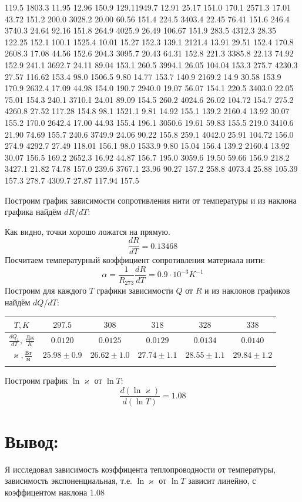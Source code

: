 \documentclass[a4paper,12pt]{article}
\begin{document}
119.5 1803.3 11.95 12.96 150.9
129.11949.7 12.91 25.17 151.0
170.1 2571.3 17.01 43.72 151.2
200.0 3028.2 20.00 60.56 151.4
224.5 3403.4 22.45 76.41 151.6
246.4 3740.3 24.64 92.16 151.8
264.9 4025.9 26.49 106.67 151.9
283.5 4312.3 28.35 122.25 152.1
100.1 1525.4 10.01 15.27 152.3
139.1 2121.4 13.91 29.51 152.4
170.8 2608.3 17.08 44.56 152.6
204.3 3095.7 20.43 64.31 152.8
221.3 3385.8 22.13 74.92 152.9
241.1 3692.7 24.11 89.04 153.1
260.5 3994.1 26.05 104.04 153.3
275.7 4230.3 27.57 116.62 153.4
98.0 1506.5 9.80 14.77 153.7
140.9 2169.2 14.9 30.58 153.9
170.9 2632.4 17.09 44.98 154.0
190.7 2940.0 19.07 56.07 154.1
220.5 3403.0 22.05 75.01 154.3
240.1 3710.1 24.01 89.09 154.5
260.2 4024.6 26.02 104.72 154.7
275.2 4260.8 27.52 117.28 154.8
98.1 1521.1 9.81 14.92 155.1
139.2 2160.4 13.92 30.07 155.2
170.0 2642.4 17.00 44.93 155.4
196.1 3050.6 19.61 59.83 155.5
219.0 3410.6 21.90 74.69 155.7
240.6 3749.9 24.06 90.22 155.8
259.1 4042.0 25.91 104.72 156.0
274.9 4292.7 27.49 118.01 156.1
98.0 1533.9 9.80 15.04 156.4
139.2 2160.4 13.92 30.07 156.5
169.2 2652.3 16.92 44.87 156.7
195.0 3059.6 19.50 59.66 156.9
218.2 3427.1 21.82 74.78 157.0
239.6 3767.1 23.96 90.27 157.2
258.8 4073.4 25.88 105.39 157.3
278.7 4309.7 27.87 117.94 157.5

Построим график зависимости сопротивления нити от температуры и из наклона графика найдём $dR/dT$:

Как видно, точки хорошо ложатся на прямую.
\[
  \frac{dR}{dT} = 0.13468
\]
Посчитаем температурный коэффициент сопротивления материала нити:
\[
  \alpha = \frac{1}{R_{273}} \frac{dR}{dT} = 0.9 \cdot 10^{-3} K^{-1}
\]
Построим для каждого $T$ графики зависимости $Q$ от $R$ и из наклонов графиков найдём $dQ/dT$:

\begin{tabular}{|c|c|c|c|c|c|}
  \hline
  $T, K$                                  & $297.5$         & $308$           & $318$           & $328$           & $338$           \\\hline
  $\frac{dQ_1}{dT},\ \frac{\text{Дж}}{K}$ & $0.0120$        & $0.0125$        & $0.0129$        & $0.0134$        & $0.0140$        \\\hline
  $\varkappa, \frac{\text{Вт}}{\text{м}}$ & $25.98 \pm 0.9$ & $26.62 \pm 1.0$ & $27.74 \pm 1.1$ & $28.55 \pm 1.1$ & $29.84 \pm 1.2$ \\\hline
  \\
\end{tabular}
Построим график $\ln\varkappa$ от $\ln T$:
\[
  \frac{d\left(\ln \varkappa\right)}{d\left(\ln T\right)} = 1.08
\]
\section{Вывод:}
Я исследовал зависимость коэффицента теплопроводности от температуры, зависимость экспоненциальная, т.е. $\ln\varkappa$ от $\ln T$ зависит линейно, с коэффицентом наклона 1.08
\end{document}
